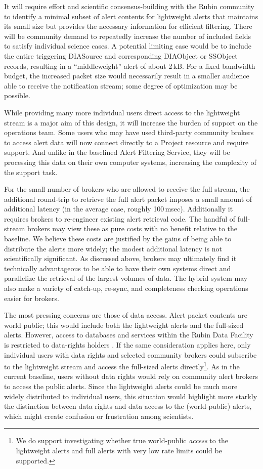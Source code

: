 \documentclass[DM,authoryear,toc]{lsstdoc}
\begin{document}
It will require effort and scientific consensus-building with the Rubin community to identify a minimal subset of alert contents for lightweight alerts that maintains its small size but provides the necessary information for efficient filtering.
There will be community demand to repeatedly increase the number of included fields to satisfy individual science cases.
A potential limiting case would be to include the entire triggering DIASource and corresponding DIAObject or SSObject records, resulting in a ``middleweight'' alert of about 2\,kB.
For a fixed bandwidth budget, the increased packet size would necessarily result in a smaller audience able to receive the notification stream; some degree of optimization may be possible.

While providing many more individual users direct access to the lightweight stream is a major aim of this design, it will increase the burden of support on the operations team.
Some users who may have used third-party community brokers to access alert data will now connect directly to a Project resource and require support.
And unlike in the baselined Alert Filtering Service, they will be processing this data on their own computer systems, increasing the complexity of the support task.

For the small number of brokers who are allowed to receive the full stream, the additional round-trip to retrieve the full alert packet imposes a small amount of additional latency (in the average case, roughly 100\,msec).
Additionally it requires brokers to re-engineer existing alert retrieval code.
The handful of full-stream brokers may view these as pure costs with no benefit relative to the baseline.
We believe these costs are justified by the gains of being able to distribute the alerts more widely; the modest additional latency is not scientifically significant.
As discussed above, brokers may ultimately find it technically advantageous to be able to have their own systems direct and parallelize the retrieval of the largest volumes of data.
The hybrid system may also make a variety of catch-up, re-sync, and completeness checking operations easier for brokers.

The most pressing concerns are those of data access.
Alert packet contents are world public; this would include both the lightweight alerts and the full-sized alerts.
However, access to databases and services within the Rubin Data Facility is restricted to data-rights holders .
If the same consideration applies here, only individual users with data rights and selected community brokers could subscribe to the lightweight stream and access the full-sized alerts directly\footnote{We do support investigating whether true world-public \textit{access} to the lightweight alerts and full alerts with very low rate limits could be supported.}.
As in the current baseline, users without data rights would rely on community alert brokers to access the public alerts.
Since the lightweight alerts could be much more widely distributed to individual users, this situation would highlight more starkly the distinction between data rights and data access to the (world-public) alerts, which might create confusion or frustration among scientists.
\end{document}
